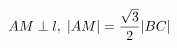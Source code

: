\documentclass[preview]{standalone}
\begin{document}
\begin{align*}
\special{dvisvgm:raw <g id='unique000'>}AM\perp l,\;|AM|=\frac{\sqrt{3}}{2}|BC|\special{dvisvgm:raw </g>}
\end{align*}
\end{document}
